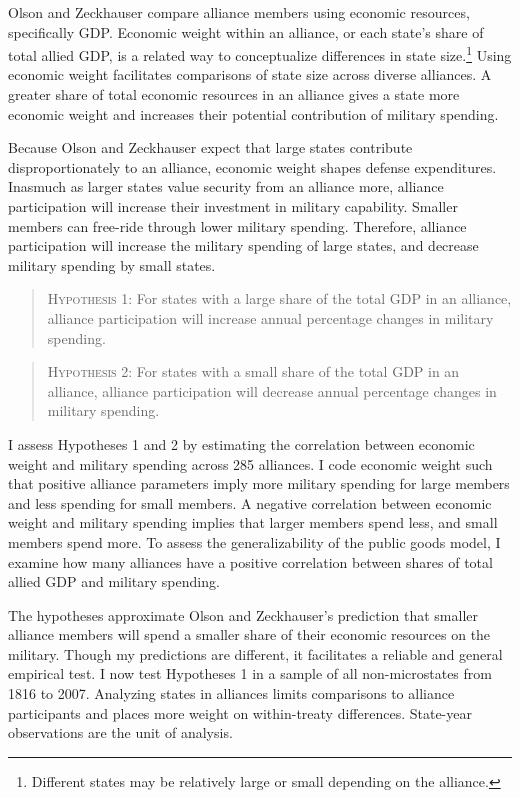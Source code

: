 \documentclass[12pt]{article}
\begin{document}
Olson and Zeckhauser compare alliance members using economic resources, specifically GDP.
Economic weight within an alliance, or each state's share of total allied GDP, is a related way to conceptualize differences in state size.\footnote{Different states may be relatively large or small depending on the alliance.} 
Using economic weight facilitates comparisons of state size across diverse alliances. 
A greater share of total economic resources in an alliance gives a state more economic weight and increases their potential contribution of military spending. 


Because Olson and Zeckhauser expect that large states contribute disproportionately to an alliance, economic weight shapes defense expenditures. 
Inasmuch as larger states value security from an alliance more, alliance participation will increase their investment in military capability.
Smaller members can free-ride through lower military spending. 
Therefore, alliance participation will increase the military spending of large states, and decrease military spending by small states. 


\begin{quote}
\textsc{Hypothesis 1}: For states with a large share of the total GDP in an alliance, alliance participation will increase annual percentage changes in military spending. 
\end{quote}


\begin{quote}
\textsc{Hypothesis 2}: For states with a small share of the total GDP in an alliance, alliance participation will decrease annual percentage changes in military spending.
\end{quote}


I assess Hypotheses 1 and 2 by estimating the correlation between economic weight and military spending across 285 alliances. 
I code economic weight such that positive alliance parameters imply more military spending for large members and less spending for small members. 
A negative correlation between economic weight and military spending implies that larger members spend less, and small members spend more. 
To assess the generalizability of the public goods model, I examine how many alliances have a positive correlation between shares of total allied GDP and military spending.  
 

The hypotheses approximate Olson and Zeckhauser's prediction that smaller alliance members will spend a smaller share of their economic resources on the military. 
Though my predictions are different, it facilitates a reliable and general empirical test.
I now test Hypotheses 1 in a sample of all non-microstates from 1816 to 2007. 
Analyzing states in alliances limits comparisons to alliance participants and places more weight on within-treaty differences. 
State-year observations are the unit of analysis.
\end{document}
